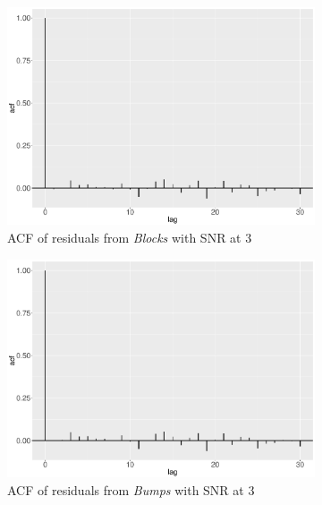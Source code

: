 \begin{figure}
    \centering
    \begin{subfigure}{0.45\textwidth}
    \centering
    \includegraphics[width=\textwidth]{Chapters/02TractorSplineTheory/plot/ggplot/ggacfBlocks3.pdf}
    \caption{ACF of residuals from \textit{Blocks} with SNR at 3 }
    \end{subfigure}%
    \begin{subfigure}{0.45\textwidth}
    \centering
    \includegraphics[width=\textwidth]{Chapters/02TractorSplineTheory/plot/ggplot/ggacfBumps3.pdf}
    \caption{ACF of residuals from \textit{Bumps} with SNR at 3 }
    \end{subfigure}
    \begin{subfigure}{0.45\textwidth}
    \centering

\end{subfigure}
\end{figure}
